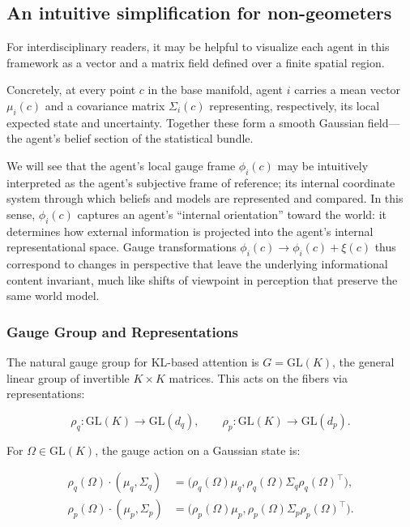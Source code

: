 \documentclass[twoside,11pt]{article}
\begin{document}
\subsection{An intuitive simplification for non-geometers}
For interdisciplinary readers, it may be helpful to visualize each agent in this framework as a vector and a matrix field defined over a finite spatial region. 

Concretely, at every point $c$ in the base manifold, agent $i$ carries a mean vector $\mu_i(c)$ and a covariance matrix $\Sigma_i(c)$ representing, respectively, its local expected state and uncertainty. Together these form a smooth Gaussian field—the agent’s belief section of the statistical bundle. 

We will see that the agent's local gauge frame $\phi_i(c)$ may be intuitively interpreted as the agent's subjective frame of reference; its internal coordinate system through which beliefs and models are represented and compared. In this sense, $\phi_i(c)$ captures an agent’s “internal orientation” toward the world: it determines how external information is projected into the agent’s internal representational space. Gauge transformations $\phi_i(c) \to \phi_i(c) + \xi(c)$ thus correspond to changes in perspective that leave the underlying informational content invariant, much like shifts of viewpoint in perception that preserve the same world model. 



\subsubsection{Gauge Group and Representations}
The natural gauge group for KL-based attention is $G = \mathrm{GL}(K)$, the general linear group of invertible $K \times K$ matrices. This acts on the fibers via representations:

\begin{equation}
\rho_q: \mathrm{GL}(K) \to \mathrm{GL}(d_q),
\qquad
\rho_p: \mathrm{GL}(K) \to \mathrm{GL}(d_p).
\label{eq:representations}
\end{equation}

For $\Omega \in \mathrm{GL}(K)$, the gauge action on a Gaussian state is:

\begin{equation}
\boxed{
\begin{aligned}
\rho_q(\Omega) \cdot (\mu_q, \Sigma_q)
&= \big(\rho_q(\Omega) \mu_q, 
\rho_q(\Omega) \Sigma_q \rho_q(\Omega)^\top\big),\\
\rho_p(\Omega) \cdot (\mu_p, \Sigma_p)
&= \big(\rho_p(\Omega) \mu_p, 
\rho_p(\Omega) \Sigma_p \rho_p(\Omega)^\top\big).
\end{aligned}
}
\label{eq:gauge_action_gaussians}
\end{equation}
\end{document}
